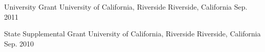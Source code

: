 

\begin{cvhonors}

  \cvhonor
    {University Grant} %
    {University of California, Riverside} %
    {Riverside, California} %
    {Sep. 2011} %

  \cvhonor
    {State Supplemental Grant} %
    {University of California, Riverside} %
    {Riverside, California} %
    {Sep. 2010} %

\end{cvhonors}
